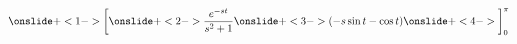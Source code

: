 \documentclass{beamer}
\begin{document}
    

    
\begin{frame}
$
\onslide+<1->{\bigg[}\onslide+<2->{\dfrac{e^{-st}}{s^2+1}}\onslide+<3->{\left(-s\sin t - \cos t\right)}\onslide+<4->{\bigg]_0^{\pi}}
$
\end{frame}   
  

  
\end{document}

